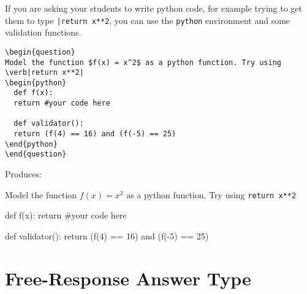 \documentclass{ximera}
\begin{document}
\begin{example}
If you are asking your students to write python code, for example trying to get them to type \verb!|return x**2!, you can use the \verb!python! environment and some validation functions.

\begin{verbatim}
\begin{question}
Model the function $f(x) = x^2$ as a python function. Try using \verb|return x**2|
\begin{python}
  def f(x):
  return #your code here

  def validator():
  return (f(4) == 16) and (f(-5) == 25)
\end{python}
\end{question}
\end{verbatim}

Produces:

\begin{question}
Model the function $f(x) = x^2$ as a python function. Try using \verb|return x**2|
\begin{python}
  def f(x):
  return #your code here

  def validator():
  return (f(4) == 16) and (f(-5) == 25)
\end{python}
\end{question}
\end{example}




\section{Free-Response Answer Type} \label{FRAnswerType}
\end{document}
